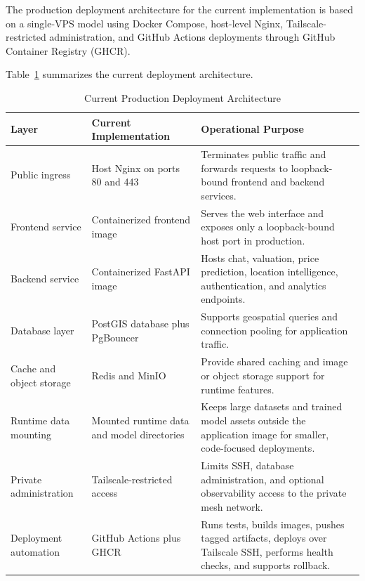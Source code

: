 The production deployment architecture for the current implementation is based on a single-VPS model using Docker Compose, host-level Nginx, Tailscale-restricted administration, and GitHub Actions deployments through GitHub Container Registry (GHCR).

Table~\ref{tab:chapter5-deployment-architecture} summarizes the current deployment architecture.

\begin{table}[htbp]
    \centering
    \small
    \renewcommand{\arraystretch}{1.25}
    \begin{tabularx}{\textwidth}{>{\raggedright\arraybackslash}p{}>{\raggedright\arraybackslash}p{}>{\raggedright\arraybackslash}X}
        \toprule
        \rowcolor[gray]{0.9} \textbf{Layer} & \textbf{Current Implementation} & \textbf{Operational Purpose} \\
        \midrule
        Public ingress & Host Nginx on ports 80 and 443 & Terminates public traffic and forwards requests to loopback-bound frontend and backend services. \\
        Frontend service & Containerized frontend image & Serves the web interface and exposes only a loopback-bound host port in production. \\
        Backend service & Containerized FastAPI image & Hosts chat, valuation, price prediction, location intelligence, authentication, and analytics endpoints. \\
        Database layer & PostGIS database plus PgBouncer & Supports geospatial queries and connection pooling for application traffic. \\
        Cache and object storage & Redis and MinIO & Provide shared caching and image or object storage support for runtime features. \\
        Runtime data mounting & Mounted runtime data and model directories & Keeps large datasets and trained model assets outside the application image for smaller, code-focused deployments. \\
        Private administration & Tailscale-restricted access & Limits SSH, database administration, and optional observability access to the private mesh network. \\
        Deployment automation & GitHub Actions plus GHCR & Runs tests, builds images, pushes tagged artifacts, deploys over Tailscale SSH, performs health checks, and supports rollback. \\
        \bottomrule
    \end{tabularx}
    \caption{Current Production Deployment Architecture}
    \label{tab:chapter5-deployment-architecture}
\end{table}


